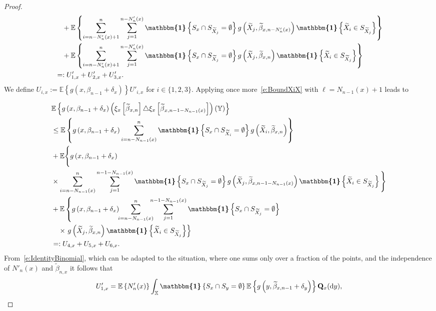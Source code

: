 \documentclass[10pt]{amsart}
\theoremstyle{definition}\newtheorem{defi}[theo]{Definition}\newtheorem{rema}[theo]{Remark}\newtheorem{exam}[theo]{Example}\newtheorem{exem}[theo]{Example}\newtheorem{nota}[theo]{Notation}
\newcommand{\bQ}{\mathbf{Q}}
\newcommand*\X{\mathbb{X}}
\newcommand*\Y{\mathbb{Y}}
\newcommand{\E}{\mathbb{E}}
\newcommand*\md{\mathrm{d}}
\newcommand{\mean}[1] {\E\left\{{#1}\right\}}
\newcommand{\ind}{\boldsymbol{\mathbbm{1}}}
\let\oldtilde\tilde
\renewcommand*{\tilde}[1]{\mathchoice{\widetilde{#1}}{\widetilde{#1}}{\oldtilde{#1}}{\oldtilde{#1}}}
\begin{document}
\begin{proof}
\begin{multline*}
\begin{aligned}
& \quad + \mean{\sum_{i=n-N_n'(x)+1}^n \sum_{j=1}^{n-N_n'(x)} \ind\left\{S_x\cap S_{\widetilde{X}_j} = \emptyset\right\} g\left(\widetilde{X}_j,\widetilde{\beta}_{x,n-N_n'(x)}\right) \ind\left\{\widetilde{X}_i\in S_{\widetilde{X}_j}\right\}} \\
& \quad + \mean{\sum_{i=n-N_n'(x)+1}^n \sum_{j=1}^{n-N_n'(x)} \ind\left\{S_x\cap S_{\widetilde{X}_j} = \emptyset\right\} g\left(\widetilde{X}_j,\widetilde{\beta}_{x,n}\right) \ind\left
\{\widetilde{X}_i \in S_{\widetilde{X}_j}\right\}} \\
& =: U'_{1,x}+U'_{2,x}+U'_{3,x}.
\end{aligned}
\end{multline*}
We define $U_{i,x}:=\mean{g(x,\beta_{n-1}+\delta_x)} U'_{i,x}$ for $i\in\{1,2,3\}$. Applying once more~\eqref{e:BoundXiX} {with $\ell=N_{n-1}(x)+1$} leads to

\begin{align*}
\mkern-35mu & \mean{g\left(x,\beta_{n-1}+\delta_x\right) \left(\xi_x\left[\tilde{\beta}_{x,n}\right] \triangle \xi_x\left[\tilde{\beta}_{x,n-1-N_{n-1}(x)}\right]\right)(\Y) }\\
& \leq \mean{g\left(x,\beta_{n-1}+\delta_x\right) \sum_{i=n-N_{n-1}(x)}^n \ind\left\{S_x\cap S_{\widetilde{X}_i}=\emptyset \right\} g\left(\widetilde{X}_i,\widetilde{\beta}_{x,n}\right) } \\
&+ \E\Bigg\{g\left(x,\beta_{n-1}+\delta_x\right)\\
&\times \sum_{i=n-N_{n-1}(x)}^n \sum_{j=1}^{n-1-N_{n-1}(x)} \ind\left\{S_x\cap S_{\widetilde{X}_j} =\emptyset\right\} g\left(\widetilde{X}_j,\widetilde{\beta}_{x,n-1-N_{n-1}(x)}\right) \ind\left\{\widetilde{X}_i \in S_{\widetilde{X}_j} \right\} \Bigg\} \\
&+ \E\left\{g\left(x,\beta_{n-1}+\delta_x\right)\!\! \sum_{i=n-N_{n-1}(x)}^n \!\!\!\!\sum_{j=1}^{n-1-N_{n-1}(x)} \ind\left\{S_x\cap S_{\widetilde{X}_j}=\emptyset \right\}\right. \\
&\quad\times\left. g\left(\widetilde{X}_j,\widetilde{\beta}_{x,n}\right) \ind\left\{\widetilde{X}_i \in S_{\widetilde{X}_j} \right\} \right\} \\
& =: U_{4,x} + U_{5,x} + U_{6,x}.
\end{align*}
From~\eqref{e:IdentityBinomial}, which can be adapted to the situation, where one sums only over a fraction of the points, and the independence of $N'_n(x)$ and $\widetilde{\beta}_{n,x}$ it follows that
\[
U'_{1,x} =\mean{N_n'(x)} \int_{\X} \ind\left\{S_x\cap S_y=\emptyset\right\} \mean{g\left(y,\widetilde{\beta}_{x,n-1}+\delta_y\right)} \bQ_x(\md y),
\]
\vspace{10pt}


\end{proof}
\end{document}
